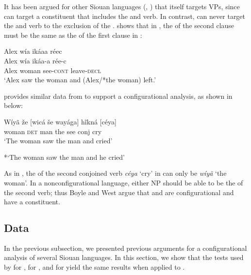 \documentclass[output=paper]{LSP/langsci}
\begin{document}
It has been argued for other Siouan languages (\citealt{Boyle2007}, \citealt{West2003}) that  itself targets VPs, since  can target a constituent that includes the  and verb. In contrast,  can never target the  and verb to the exclusion of the .  \citet{Boyle2007} shows that in , the  of the second clause must be the same as the  of the first clause in :

\begin{exe}
\ex\label{ex:jrs:29} 
\glll Alex w\'ia ik\'aaa r\'eec\\
Alex w\'ia ik\'aa-a r\'ee-c \\
Alex woman see-\textsc{cont} leave-\textsc{decl} \\
\trans `Alex saw the woman and (Alex/*the woman) left.' \citep[217]{Boyle2007} 
\end{exe}

\citet{West2003} provides similar data from  to support a configurational analysis, as shown in  below:

\begin{exe}
\ex\label{ex:jrs:30} \gll W\'iy\~a 	 \v{z}e 		[wic\'a 	\v{s}e 	way\'aga] h\~ikn\'a 	[c\'eya] \\
woman 	\textsc{det} 	man 		the see 				conj 		cry \\
\trans `The woman saw the man and cried'

*`The woman saw the man and he cried' \citep[34]{West2003}
\end{exe}

As in , the  of the second conjoined verb \textit{c\'eya} `cry' in  can only be \textit{w\'iy\~a} `the woman'.  In a nonconfigurational language, either NP should be able to be the  of the second verb; thus Boyle and West argue that  and  are configurational and have a  constituent.

\subsection{ Data}

In the previous subsection, we presented previous arguments for a configurational analysis of several Siouan languages.  In this section, we show that the tests used by \citet{Boyle2007} for , \citet{Graczyk1991a} for , and \citet{West2003} for  yield the same results when applied to .
	
\end{document}
